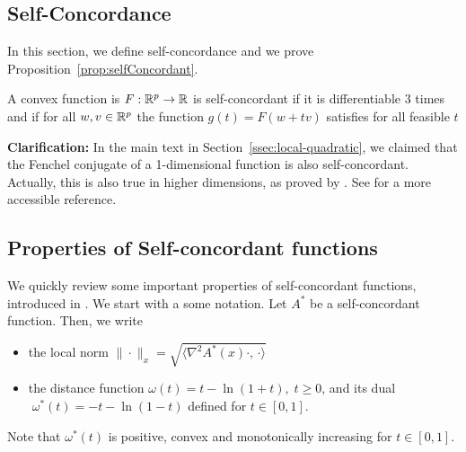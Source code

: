 \begin{subappendices}
\section{Self-Concordance}
\label{app:self-concordant}

In this section, we define self-concordance and we prove Proposition~\ref{prop:selfConcordant}.

\begin{definition}
\label{def:self-concordance}
A convex function is $F:\mathbb{R}^p \rightarrow \mathbb{R}$ is self-concordant if it is differentiable $3$ times and if for all $w, v \in\mathbb{R}^p$ the function $g(t) = F(w+tv)$ satisfies for all feasible $t$
\end{definition}


{\bf Clarification:} In the main text in Section~\ref{ssec:local-quadratic}, we claimed that the Fenchel conjugate of a 1-dimensional function is also self-concordant. 
Actually, this is also true in higher dimensions, as proved by \citet{nesterov1994interior}. See \citet[Prop.~6]{sun2019generalized} for a more accessible reference.


\subsection{Properties of Self-concordant functions}

We quickly review some important properties of self-concordant functions, introduced in \citep{nesterov2003introductory}. We start with a some notation. Let $A^*$ be a self-concordant function. Then, we write
\begin{itemize}
	\item the local norm $\|\cdot\|_x = \sqrt{ \langle \nabla^2A^*(x)\cdot,\, \cdot \rangle }$ 
	\item the distance function $\omega(t) = t-\ln (1+t),\;t\geq 0$, and its dual $\;\omega^*(t) = -t-\ln(1-t)$ defined for $t\in [0,1]$.
\end{itemize}
Note that $\omega^*(t)$ is positive, convex and monotonically increasing for $t\in[0,1]$.


\end{subappendices}

